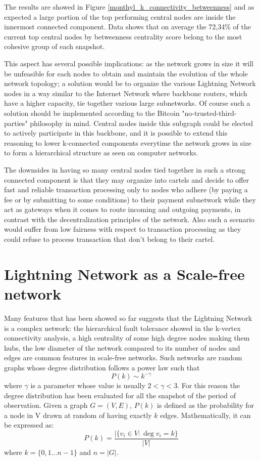 	The results are showed in Figure \ref{monthyl_k_connectivity_betweenness} and as expected a large portion of the top performing central nodes are inside the innermost connected component. Data shows that on average the 72,34\% of the current top central nodes by betweenness centrality score belong to the most cohesive group of each snapshot.
	
	This aspect has several possible implications: as the network grows in size it will be unfeasible for each nodes to obtain and maintain the evolution of the whole network topology; a solution would be to organize the various Lightning Network nodes in a way similar to the Internet Network where backbone routers, which have a higher capacity, tie together various large subnetworks. Of course such a solution should be implemented according to the Bitcoin "no-trusted-third-parties" philosophy in mind. Central nodes inside this subgraph could be elected to actively participate in this backbone, and it is possible to extend this reasoning to lower k-connected components everytime the network grows in size to form a hierarchical structure as seen on computer networks. 
	
	The downsides in having so many central nodes tied together in such a strong connected component is that they may organize into cartels and decide to offer fast and reliable transaction processing only to nodes who adhere (by paying a fee or by submitting to some conditions) to their payment subnetwork while they act as gateways when it comes to route incoming and outgoing payments, in contrast with the decentralization principles of the network. Also such a scenario would suffer from low fairness with respect to transaction processing as they could refuse to process transaction that don't belong to their cartel.

	\section{Lightning Network as a Scale-free network}
	
	Many features that has been showed so far suggests that the Lightning Network is a complex network: the hierarchical fault tolerance showed in the k-vertex connectivity analysis, a high centrality of some high degree nodes making them hubs, the low diameter of the network compared to its number of nodes and edges are common features in scale-free networks. Such networks are random graphs whose degree distribution follows a power law such that 
	$$P(k) \sim k^{-\gamma}$$
	where $\gamma$ is a parameter whose value is usually $2 < \gamma < 3$. For this reason the degree distribution has been evaluated for all the snapshot of the period of observation. Given a graph $G = (V,E)$, $P(k)$ is defined as the probability for a node in V drawn at random of having exactly $k$ edges. Mathematically, it can be expressed as:
	$$P(k) = \frac{|\{ v_i \in V : \deg v_i = k \}}{|V|}$$
	where $k = \{0,1 ... n - 1\}$ and $n = |G|$. 
	

